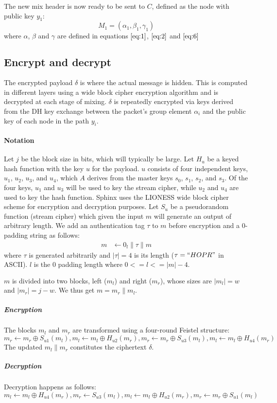 The new mix header is now ready to be sent to $C$, defined as the node with public key $y_1$:
$$M_1=(\alpha_1,\beta_1,\gamma_1)$$
where $\alpha$, $\beta$ and $\gamma$ are defined in equations $\ref{eq:1}$, $\ref{eq:2}$ and $\ref{eq:6}$
\subsection{Encrypt and decrypt}
The encrypted payload $\delta$ is where the actual message is hidden. This is computed in different layers using a wide block cipher encryption algorithm and is decrypted at each stage of mixing.
$\delta$ is repeatedly encrypted via keys derived from the DH key exchange between the packet’s group element $\alpha_i$ and the public key of each node in the path $y_i$.

\paragraph{Notation}
Let $j$ be the block size in bits, which will typically be large. Let $H_u$ be a keyed hash function with the key $u$ for the payload. $u$ consists of four independent keys, $u_1$, $u_2$, $u_3$, and $u_4$, which $A$ derives from the master keys $s_0$, $s_1$, $s_2$, and $s_3$. Of the four keys, $u_1$ and $u_3$ will be used to key the stream cipher, while $u_2$ and $u_4$ are used to key the hash function. Sphinx uses the LIONESS wide block cipher scheme for encryption and decryption purposes.
Let $S_u$ be a pseudorandom function (stream cipher) which given the input $m$ will generate an output of arbitrary length. We add an authentication tag $\tau$ to $m$ before encryption and a 0-padding string as follows:
\begin{align}
   m &\leftarrow 0_{l} \|\tau\|m
    \end{align}
where $\tau$ is generated arbitrarily and $|\tau|=4$ is its length ($\tau=``HOPR "$ in ASCII). $l$ is the $0$ padding length where
$0 <= l <= |m| - 4$.

$m$ is divided into two blocks, left ($m_l$) and right ($m_r$), whose sizes are $|m_l|=w$ and $|m_r|=j-w$. We thus get $m=m_r\|m_l$.
\subparagraph{Encryption}
The blocks $m_l$ and $m_r$ are transformed using a four-round Feistel structure:
$$m_r\leftarrow m_r \oplus S_{u1}(m_l), m_l\leftarrow m_l \oplus H_{u2}(m_r), m_r\leftarrow m_r\oplus S_{u3}(m_l), m_l\leftarrow m_l\oplus H_{u4}(m_r)$$
The updated $m_l\|m_r$ constitutes the ciphertext $\delta$.
\subparagraph{Decryption} Decryption happens as follows:
$$m_l\leftarrow m_l\oplus H_{u4}(m_r), m_r\leftarrow S_{u3}(m_l), m_l\leftarrow m_l\oplus H_{u2}(m_r), m_r\leftarrow m_r\oplus S_{u1}(m_l)$$

